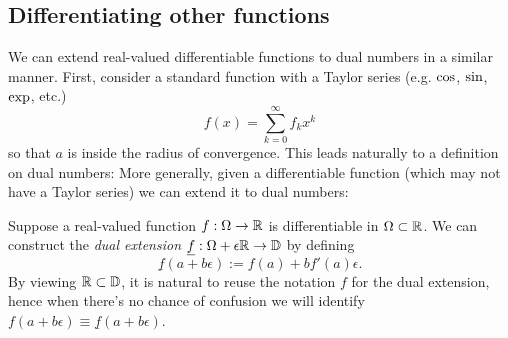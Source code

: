 \subsection{Differentiating other functions}
We can extend real-valued differentiable functions to dual numbers in a similar manner. First, consider a standard function with a Taylor series (e.g. ${\rm cos}$, ${\rm sin}$, ${\rm exp}$, etc.)
\[
f(x) = \ensuremath{\sum}_{k=0}^\ensuremath{\infty} f_k x^k
\]
so that $a$ is inside the radius of convergence. This leads naturally to a definition on dual numbers:
More generally, given a differentiable function (which may not have a Taylor series) we can extend it to dual numbers:

\begin{definition} Suppose a real-valued function $f : \Omega \rightarrow {\mathbb R}$ is differentiable in $\Omega \subset {\mathbb R}$.  We can construct the \emph{dual extension} $\underline{f} : \Omega + \epsilon{\mathbb R} \rightarrow {\mathbb D}$ by defining
\[
\underline{f}(a + b \ensuremath{\epsilon}) := f(a) + b f'(a) \ensuremath{\epsilon}.
\]
By viewing ${\mathbb R} \subset {\mathbb D}$, it is natural to reuse the notation $f$ for the dual extension, hence when there's no chance of confusion we will identify $f(a + b \ensuremath{\epsilon}) \ensuremath{\equiv} \underline{f}(a+b \ensuremath{\epsilon})$. \end{definition}

